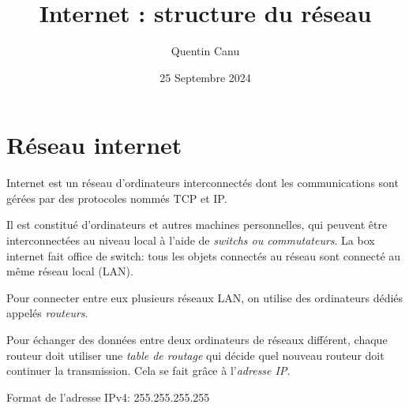 \documentclass{article}
\title{Internet : structure du réseau}
\date{25 Septembre 2024}
\author{Quentin Canu}
\begin{document}
\maketitle

\section{Réseau internet}

Internet est un réseau d'ordinateurs interconnectés dont les communications sont gérées par des protocoles nommés TCP et IP.

Il est constitué d'ordinateurs et autres machines personnelles, qui peuvent être interconnectées au niveau local à l'aide de \emph{switchs ou commutateurs}. La box internet fait office de switch: tous les objets connectés au réseau sont connecté au même réseau local (LAN).

Pour connecter entre eux plusieurs réseaux LAN, on utilise des ordinateurs dédiés appelés \emph{routeurs}.

Pour échanger des données entre deux ordinateurs de réseaux différent, chaque routeur doit utiliser une \emph{table de routage} qui décide quel nouveau routeur doit continuer la transmission. Cela se fait grâce à l'\emph{adresse IP}.

Format de l'adresse IPv4: 255.255.255.255
\end{document}
